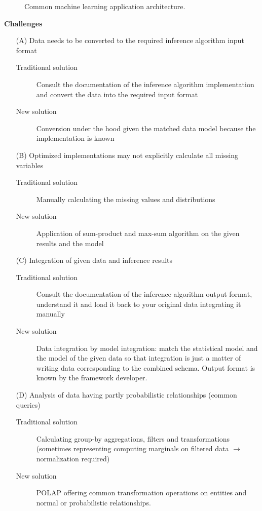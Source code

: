 \begin{figure}
\centering
\scalebox{\tikzScale}{\adjustTikzSize }
\caption{Common machine learning application architecture.}\label{fig:ml-application-architecture}
\end{figure}

\textbf{Challenges}
\begin{enumerate}
\item[(A)] Data needs to be converted to the required inference algorithm input format
	\begin{description}
	\item[Traditional solution] Consult the documentation of the inference algorithm implementation and convert the data into the required input format
	\item[New solution] Conversion under the hood given the matched data model because the implementation is known
	\end{description}
\item[(B)] Optimized implementations may not explicitly calculate all missing variables
	\begin{description}
	\item[Traditional solution] Manually calculating the missing values and distributions
	\item[New solution] Application of sum-product and max-sum algorithm on the given results and the model
	\end{description}
\item[(C)] Integration of given data and inference results
	\begin{description}
	\item[Traditional solution] Consult the documentation of the inference algorithm output format, understand it and load it back to your original data integrating it manually
	\item[New solution] Data integration by model integration: match the statistical model and the model of the given data so that integration is just a matter of writing data corresponding to the combined schema. Output format is known by the framework developer.
	\end{description}
\item[(D)] Analysis of data having partly probabilistic relationships (common queries)
	\begin{description}
	\item[Traditional solution] Calculating group-by aggregations, filters and transformations (sometimes representing computing marginals on filtered data $\rightarrow$ normalization required)
	\item[New solution] POLAP offering common transformation operations on entities and normal or probabilistic relationships.
	\end{description}
\end{enumerate}

